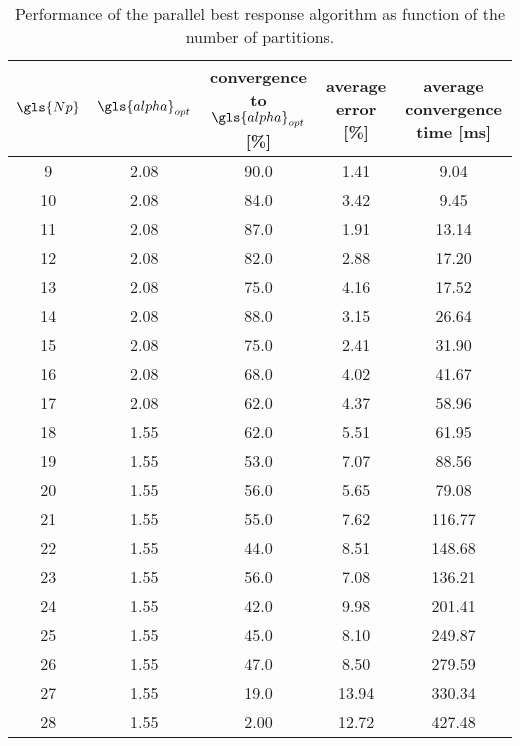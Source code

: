 \documentclass[main.tex]{subfiles}
\begin{document}
\begin{table}[htbp]
    \centering
    \caption{Performance of the parallel best response algorithm as function of the number of partitions.}
    \label{tab:best-response-multi}
    \begin{tabular}{c|cccc}
        \toprule
        $\gls{Np}$ & $\gls{alpha}_{opt}$ & convergence to $\gls{alpha}_{opt}$ [\si{\percent}]  & average error [\si{\percent}] & average convergence time [\si{\milli\second}] \\
        \midrule
        \num{9 }  &  \num{2.08}  &  \num{90.0} & \num{1.41}  &  \num{9.04}   \\
        \num{10}  &  \num{2.08}  &  \num{84.0} & \num{3.42}  &  \num{9.45}   \\
        \num{11}  &  \num{2.08}  &  \num{87.0} & \num{1.91}  &  \num{13.14}  \\
        \num{12}  &  \num{2.08}  &  \num{82.0} & \num{2.88}  &  \num{17.20}  \\
        \num{13}  &  \num{2.08}  &  \num{75.0} & \num{4.16}  &  \num{17.52}  \\
        \num{14}  &  \num{2.08}  &  \num{88.0} & \num{3.15}  &  \num{26.64}  \\
        \num{15}  &  \num{2.08}  &  \num{75.0} & \num{2.41}  &  \num{31.90}  \\
        \num{16}  &  \num{2.08}  &  \num{68.0} & \num{4.02}  &  \num{41.67}  \\
        \num{17}  &  \num{2.08}  &  \num{62.0} & \num{4.37}  &  \num{58.96}  \\
        \num{18}  &  \num{1.55}  &  \num{62.0} & \num{5.51 } &  \num{61.95}  \\
        \num{19}  &  \num{1.55}  &  \num{53.0} & \num{7.07 } &  \num{88.56}  \\
        \num{20}  &  \num{1.55}  &  \num{56.0} & \num{5.65 } &  \num{79.08}  \\
        \num{21}  &  \num{1.55}  &  \num{55.0} & \num{7.62 } &  \num{116.77} \\
        \num{22}  &  \num{1.55}  &  \num{44.0} & \num{8.51 } &  \num{148.68} \\
        \num{23}  &  \num{1.55}  &  \num{56.0} & \num{7.08 } &  \num{136.21} \\
        \num{24}  &  \num{1.55}  &  \num{42.0} & \num{9.98 } &  \num{201.41} \\
        \num{25}  &  \num{1.55}  &  \num{45.0} & \num{8.10 } &  \num{249.87} \\
        \num{26}  &  \num{1.55}  &  \num{47.0} & \num{8.50 } &  \num{279.59} \\
        \num{27}  &  \num{1.55}  &  \num{19.0} & \num{13.94} &  \num{330.34} \\
        \num{28}  &  \num{1.55}  &  \num{2.00} & \num{12.72} &  \num{427.48} \\
        \bottomrule
    \end{tabular}
\end{table}
\end{document}
